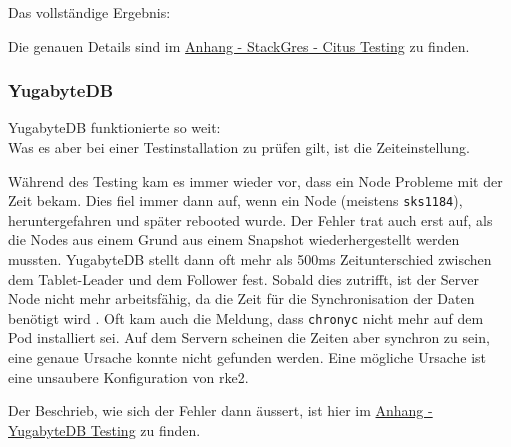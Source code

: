 \clearpage
{}
\recalctypearea
\begin{flushleft}
    Das vollständige Ergebnis:
    
    Die genauen Details sind im \hyperref[subsec:appendix_testing_stackgres_citus]{Anhang - StackGres - Citus Testing} zu finden.
\end{flushleft}
\begin{flushleft}
    \subsubsection{YugabyteDB}
    YugabyteDB funktionierte so weit:\\
    
    Was es aber bei einer Testinstallation zu prüfen gilt, ist die Zeiteinstellung.
\end{flushleft}
\clearpage
{}
\recalctypearea
\begin{flushleft}
    Während des Testing kam es immer wieder vor, dass ein Node Probleme mit der Zeit bekam.
    Dies fiel immer dann auf, wenn ein Node (meistens \texttt{sks1184}), heruntergefahren und später rebooted wurde.
    Der Fehler trat auch erst auf, als die Nodes aus einem Grund aus einem Snapshot wiederhergestellt werden mussten.
    YugabyteDB stellt dann oft mehr als 500ms Zeitunterschied zwischen dem Tablet-Leader und dem Follower fest.
    Sobald dies zutrifft, ist der Server Node nicht mehr arbeitsfähig, da die Zeit für die Synchronisation der Daten benötigt wird \cite{BYH9Z3MS}.
    Oft kam auch die Meldung, dass \texttt{chronyc} nicht mehr auf dem Pod installiert sei.
    Auf dem Servern scheinen die Zeiten aber synchron zu sein, eine genaue Ursache konnte nicht gefunden werden.
    Eine mögliche Ursache ist eine unsaubere Konfiguration von \gls{rke2}.
\end{flushleft}
\begin{flushleft}
    Der Beschrieb, wie sich der Fehler dann äussert, ist hier im \hyperref[subsec:appendix_testing_yugabytedb]{Anhang - YugabyteDB Testing} zu finden.
\end{flushleft}